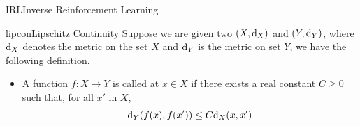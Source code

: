 \documentclass[9pt]{article}
\begin{document}
\begin{topic}{IRL}{Inverse Reinforcement Learning}
\citep{Abbeel2004Apprenticeship}
\citep{Ziebart2008Maximum}
\citep{Syed2007Game}
\citep{Finn2016Guided}
\citep{Levine2011Nonlinear}

\end{topic}

\begin{topic}{lipcon}{Lipschitz Continuity}
Suppose we are given two  $(X,\mathrm{d}_X)$ and $(Y,\mathrm{d}_Y)$, where $\mathrm{d}_X$ denotes the metric on the set $X$ and $\mathrm{d}_Y$ is the metric on set $Y$, we have the following definition.
\begin{itemize}
\item A function $f:X\rightarrow Y$ is called  at $x\in X$ if there exists a real constant $C\geq 0$ such that, for all $x'$ in $X$,
\[
\mathrm{d}_Y(f(x), f(x')) \le C \mathrm{d}_X(x, x')
\]
\end{itemize}
\citep{Eriksson2013Applied}
\end{topic}
\end{document}

